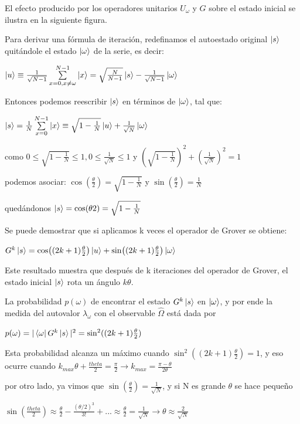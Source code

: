 \documentclass[11pt, spanish]{report}
\begin{document}
El efecto producido por los operadores unitarios $U_\omega$ y $G$ sobre el
estado inicial se ilustra en la siguiente figura.


Para derivar una fórmula de iteración, redefinamos el autoestado original
$\ket{s}$ quitándole el estado $\ket{\omega}$ de la serie, es decir:

$\ket{u} \equiv \frac{1}{\sqrt{N-1}} \sum\limits_{x=0, x\neq\omega}^{N-1}
\ket{x} = \sqrt{\frac{N}{N-1}} \ket{s} - \frac{1}{\sqrt{N-1}} \ket{\omega}$

Entonces podemos reescribir $\ket{s}$ en términos de $\ket{\omega}$, tal que:

$\ket{s} = \frac{1}{N} \sum\limits_{x=0}^{N-1} \ket{x} \equiv
\sqrt{1-\frac{1}{N}} \ket{u} + \frac{1}{\sqrt{N}} \ket{\omega}$

como $0\leq \sqrt{1-\frac{1}{N}} \leq 1, 0\leq \frac{1}{\sqrt{N}} \leq 1$ y
$(\sqrt{1-\frac{1}{N}})^2 + (\frac{1}{\sqrt{N}})^2 = 1$

podemos asociar: $\cos(\frac{\theta}{2}) = \sqrt{1-\frac{1}{N}}$ y
$\sin(\frac{\theta}{2}) = \frac{1}{N}$

quedándonos $\ket{s} = \cos({\theta}{2}) = \sqrt{1-\frac{1}{N}}$

Se puede demostrar que si aplicamos k veces el operador de Grover se obtiene:

$G^k \ket{s} = \cos((2k+1)\frac{\theta}{2}) \ket{u} +
\sin((2k+1)\frac{\theta}{2}) \ket{\omega}$

Este resultado muestra que después de k iteraciones del operador de Grover, el
estado inicial $\ket{s}$ rota un ángulo $k\theta$.


La probabilidad $p(\omega)$ de encontrar el estado $G^k \ket{s}$ en
$\ket{\omega}$, y por ende la medida del autovalor $\lambda_\omega$ con el
observable $\hat{\Omega}$ está dada por

$p(\omega) = |\bra{\omega} G^k \ket{s}|^2 = \sin^2((2k+1)\frac{\theta}{2})$

Esta probabilidad alcanza un máximo cuando $\sin^2((2k+1)\frac{\theta}{2}) = 1$,
y eso ocurre cuando $k_{max} \theta + \frac{theta}{2} = \frac{\pi}{2}
\rightarrow k_{max} = \frac{\pi-\theta}{2\theta}$

por otro lado, ya vimos que $\sin(\frac{\theta}{2}) = \frac{1}{\sqrt{N}}$, y si
N es grande $\theta$ se hace pequeño

$\sin(\frac{theta}{2}) \approx \frac{\theta}{2} - \frac{(\theta/2)^3}{3!} + ...
\approx \frac{\theta}{2} = \frac{1}{\sqrt{N}} \rightarrow \theta \approx \frac{2}{\sqrt{N}}$
\end{document}
